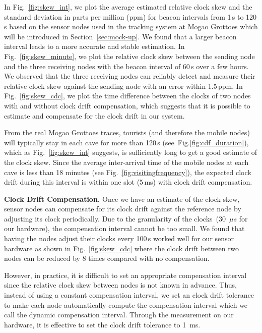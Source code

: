 \documentclass[twoside,twocolumn]{article}
\begin{document}
In Fig.~\ref{fig:skew_int}, we plot the average estimated relative
clock skew and the standard deviation in parts per million (ppm) for
beacon intervals from 1\,s to 120\,s based on the sensor nodes used
in the tracking system at Mogao Grottoes which will be introduced in 
Section~\ref{sec:mock-up}. We found that a larger beacon
interval leads to a more accurate and stable estimation.  In
Fig.~\ref{fig:skew_minute}, we plot the relative clock skew between
the sending node and the three receiving nodes with the beacon
interval of 60\,s over a few hours.  We observed that the three
receiving nodes can reliably detect and measure their relative clock
skew against the sending node with an error within 1.5\,ppm. In
Fig.~\ref{fig:skew_cdc}, we plot the time difference between the
clocks of two nodes with and without clock drift compensation, which
suggests that it is possible to estimate and compensate for the clock
drift in our system.

From the real Mogao Grottoes traces, tourists (and therefore the mobile
nodes) will typically stay in each cave for more than 120\,s
(see~Fig.\ref{fig:cdf_duration}), which as Fig.~\ref{fig:skew_int}
suggests, is sufficiently long to get a good estimate of the clock
skew. Since the average inter-arrival time of the mobile nodes at each
cave is less than 18 minutes (see Fig.~\ref{fig:visitingfrequency}),
the expected clock drift during this interval is within one slot
(5\,ms) with clock drift compensation.

{\bf Clock Drift Compensation.} Once we have an estimate of the clock
skew, sensor nodes can compensate for its clock drift against the
reference node by adjusting its clock periodically. Due to the
granularity of the clocks~(30~$\mu s$ for our hardware), the compensation
interval cannot be too small. We found that having the nodes adjust 
their clocks every 100\,s worked well for our sensor hardware as shown 
in Fig.~\ref{fig:skew_cdc} where the clock drift between two nodes can
be reduced by 8 times compared with no compensation.

However, in practice, it is difficult to set an appropriate compensation
interval since the relative clock skew between nodes is not known in advance.
Thus, instead of using a constant compensation interval, we set an clock
drift tolerance to make each node automatically compute the compensation
interval which we call the dynamic compensation interval. Through the 
measurement on our hardware, it is effective to set the clock drift tolerance 
to 1~ms.
\end{document}
